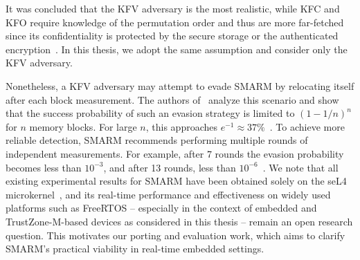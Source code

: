 \documentclass[a4paper,10pt]{article}
\begin{document}
\begin{table}[h]
    \centering
    \caption{Adversary knowledge considered in SMARM's security analysis~\cite{carpent2018smarm}.}
    \label{tab:smarm-adversary}
\end{table}

It was concluded that the KFV adversary is the most realistic, while KFC and KFO require knowledge of the permutation order and thus are more far-fetched since its confidentiality is protected by the secure storage or the authenticated encryption~\cite{carpent2018smarm}. 
In this thesis, we adopt the same assumption and consider only the KFV adversary.

Nonetheless, a KFV adversary may attempt to evade SMARM by relocating itself after each block measurement. The authors of~\cite{carpent2018smarm} analyze this scenario and show that the success probability of such an evasion strategy is limited to $(1-1/n)^n$ for $n$ memory blocks.
For large $n$, this approaches $e^{-1}\approx 37\%$~\cite{carpent2018smarm}.
To achieve more reliable detection, SMARM recommends performing multiple rounds of independent measurements. 
For example, after 7 rounds the evasion probability becomes less than $10^{-3}$, and after 13 rounds, less than $10^{-6}$~\cite{carpent2018smarm}.
We note that all existing experimental results for SMARM have been obtained solely on the seL4 microkernel~\cite{klein2009sel4}, and its real-time performance and effectiveness on widely used platforms such as FreeRTOS -- especially in the context of embedded and TrustZone-M-based devices as considered in this thesis -- remain an open research question. 
This motivates our porting and evaluation work, which aims to clarify SMARM's practical viability in real-time embedded settings.
\end{document}

